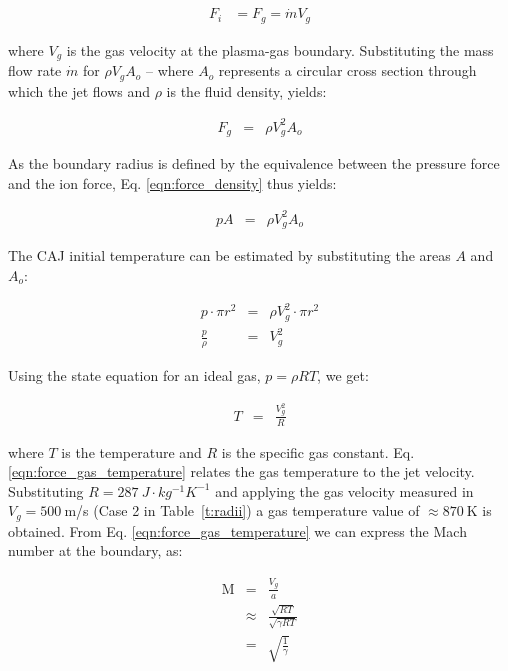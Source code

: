 \documentclass[a4paper]{iacas}%
\begin{document}
\begin{align}\label{eqn:force_mass_flux}
	F_i & = F_g = \dot{m} V_g
\end{align}

\noindent where $V_g$ is the gas velocity at the plasma-gas boundary. Substituting the mass flow rate $\dot{m}$ for $\rho V_g A_{o}$ -- where $A_{o}$ represents a circular cross section through which the jet flows and $\rho$ is the fluid density, yields:

\begin{eqnarray}\label{eqn:force_density}
F_g &=& \rho V^2_g A_{o}
\end{eqnarray}

\noindent As the boundary radius is defined by the equivalence between the pressure force and the ion force, 
Eq. \eqref{eqn:force_density} thus yields:

\begin{eqnarray}\label{eqn:force_gas_equal}
p A &=& \rho V^2_g A_{o}
\end{eqnarray}

The CAJ initial temperature can be estimated by substituting the areas $A$ and $A_o$: 

\begin{eqnarray}\label{eqn:force_gas_ratio}
p \cdot \pi r^2 &=& \rho V^2_g \cdot \pi r^2 \\
\frac{p}{\rho} &=& V^2_g
\end{eqnarray}

Using the state equation for an ideal gas, $p = \rho RT$, we get:

\begin{eqnarray}\label{eqn:force_gas_temperature}
	T &=& \frac{V^2_g}{R}
\end{eqnarray}

\noindent where $T$ is the temperature and $R$ is the specific gas constant. Eq. \eqref{eqn:force_gas_temperature} relates the gas temperature to the jet velocity. Substituting $R = 287~J\cdot kg^{-1} K^{-1}$ and applying the gas velocity measured in \cite{KRClose} $V_g = 500~$m/s (Case 2 in Table~\ref{t:radii}) a gas temperature value of $\approx 870~\mathrm{K}$ is obtained. From Eq. \eqref{eqn:force_gas_temperature} we can express the Mach number at the boundary, as:

\begin{eqnarray}
	\mathrm{M} &=& \frac{V_g}{a} \\
	 &\approx& \frac{\sqrt{RT}}{\sqrt{\gamma R T}}\\\label{eqn:mach}
	 &=& \sqrt{\frac{1}{\gamma}}
\end{eqnarray}
\end{document}
